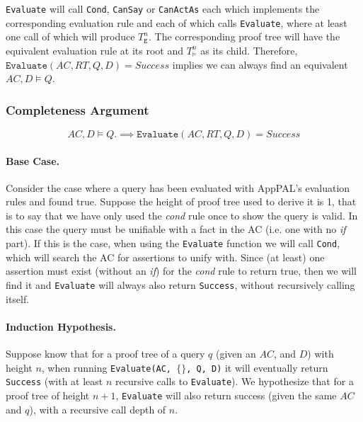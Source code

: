 \documentclass[thesis.tex]{subfiles}
\begin{document}
\texttt{Evaluate} will call \texttt{Cond}, \texttt{CanSay} or
\texttt{CanActAs} each which implements the corresponding evaluation
rule and each of which calls \texttt{Evaluate}, where at least one
call of which will produce $T_{\mathtt{E}}^n$.  The corresponding
proof tree will have the equivalent evaluation rule at its root and
$T_{\models}^n$ as its child.  Therefore, $\mathtt{Evaluate}(AC, RT, Q,
D) = \textit{Success}$ implies we can always find an equivalent $AC, D
\models Q.$

\subsubsection*{Completeness Argument}

\begin{equation*}
  AC, D \models Q.
  \implies
  \mathtt{Evaluate}(AC, RT, Q, D) = \textit{Success} 
\end{equation*}


\paragraph*{Base Case.}  Consider the case where a query has been
evaluated with AppPAL's evaluation rules and found true. Suppose the
height of proof tree used to derive it is 1, that is to say that we
have only used the \emph{cond} rule once to show the query is
valid. In this case the query must be unifiable with a fact in the AC
(i.e. one with no \emph{if} part).  If this is the case, when using
the \texttt{Evaluate} function we will call \texttt{Cond}, which will
search the AC for assertions to unify with.  Since (at least) one
assertion must exist (without an \emph{if}) for the \emph{cond} rule
to return true, then we will find it and \texttt{Evaluate} will always
also return \texttt{Success}, without recursively calling itself.

\paragraph*{Induction Hypothesis.}  Suppose know that for a proof
tree of a query $q$ (given an $AC$, and $D$) with height $n$, when running
\texttt{Evaluate(AC, $\{\}$, Q, D)} it will eventually return
\texttt{Success} (with at least $n$ recursive calls to
\texttt{Evaluate}).  We hypothesize that for a proof tree of height
$n+1$, \texttt{Evaluate} will also return success (given the same
$AC$ and $q$), with a recursive call depth of $n$.
\end{document}
